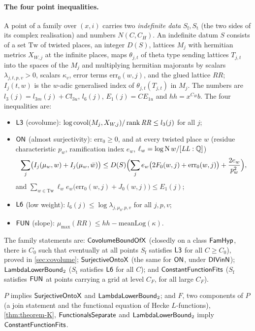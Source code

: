 \paragraph{The four point inequalities.}
A point of a family over $(x,i)$ carries two \emph{indefinite data} $S_{\mathrm f},S_{\mathrm t}$ (the two sides
of its complex realisation) and numbers $N(C,C_H)$. An indefinite datum $S$ consists of a set $\mathrm{Tw}$ of
twisted places, an integer $D(S)$, lattices $M_j$ with hermitian metrics $X_{W,j}$ at the infinite places, maps
$\theta_{j,t}$ of theta type sending lattices $T_{j,t}$ into the spaces of the $M_j$ and multiplying hermitian
majorants by scalars $\lambda_{j,t,p,v}>0$, scalars $\kappa_v$, error terms $\mathrm{err}_0(w,j)$, and the glued
lattice $\mathit{RR}$; $I_j(t,w)$ is the $w$-adic generalised index of $\theta_{j,t}(T_{j,t})$ in $M_j$. The numbers
are $l_3(j)=l_{3m}(j)+Cl_{3u}$, $l_6(j)$, $E_1(j)=CE_{1u}$ and $hh=x^{C_H}b$. The four inequalities are:
\begin{itemize}
\item $\mathsf{L3}$ (covolume): $\log\operatorname{covol}(M_j,X_{W,j})/\operatorname{rank}\mathit{RR}\le l_3(j)$ for all $j$;
\item $\mathsf{ON}$ (almost surjectivity): $\mathrm{err}_0\ge0$, and at every twisted place $w$ (residue
characteristic $p_w$, ramification index $e_w$, $\ell_w=\log\operatorname{N} w/[\mathit{LL}:\mathbb{Q}]$)
\[
\sum_j\bigl(I_j(\mu_w,w)+I_j(\mu_w,\bar w)\bigr)\le D(S)\Bigl(\sum_j e_w\bigl(2F_0(w,j)+\mathrm{err}_0(w,j)\bigr)
+\frac{2e_w}{p_w^2}\Bigr),
\]
and $\sum_{w\in\mathrm{Tw}}\ell_w e_w\bigl(\mathrm{err}_0(w,j)+J_0(w,j)\bigr)\le E_1(j)$;
\item $\mathsf{L6}$ (low weight): $l_6(j)\le\log\lambda_{j,\mu_0,p,v}$ for all $j,p,v$;
\item $\mathsf{FUN}$ (slope): $\mu_{\max}(\mathit{RR})\le hh-\mathrm{meanLog}(\kappa)$.
\end{itemize}
The family statements are: $\mathsf{CovolumeBoundOfX}$ (closedly on a class $\mathsf{FamHyp}$, there is $C_0$ such
that eventually at all points $S_{\mathrm f}$ satisfies $\mathsf{L3}$ for all $C\ge C_0$), proved in
\cref{sec:covolume}; $\mathsf{SurjectiveOntoX}$ (the same for $\mathsf{ON}$, under $\mathsf{DIVinN}$);
$\mathsf{LambdaLowerBound}_2$ ($S_{\mathrm t}$ satisfies $\mathsf{L6}$ for all $C$); and
$\mathsf{ConstantFunctionFits}$ ($S_{\mathrm f}$ satisfies $\mathsf{FUN}$ at points carrying a grid at level
$C_F$, for all large $C_F$).

\begin{proposition}\Fmark\label{prop:families:points}
$P$ implies $\mathsf{SurjectiveOntoX}$ and $\mathsf{LambdaLowerBound}_2$; and $F$, two components of $P$ (a join
statement and the functional equation of Hecke $L$-functions), \cref{thm:theorem-K}, $\mathsf{FunctionalsSeparate}$
and $\mathsf{LambdaLowerBound}_2$ imply $\mathsf{ConstantFunctionFits}$.
\end{proposition}

